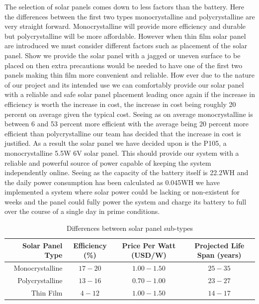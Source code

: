 The selection of solar panels comes down to less factors than the battery. Here the differences between the first two types monocrystalline and polycrystalline are very straight forward. Monocrystalline will provide more efficiency and durable but polycrystalline will be more affordable. However when thin film solar panel are introduced we must consider different factors such as placement of the solar panel. Show we provide the solar panel with a jagged or uneven surface to be placed on then extra precautions would be needed to have one of the first two panels making thin film more convenient and reliable. How ever due to the nature of our project and its intended use we can comfortably provide our solar panel with a reliable and safe solar panel placement leading once again if the increase in efficiency is worth the increase in cost, the increase in cost being roughly 20 percent on average given the typical cost. Seeing as on average monocrystalline is between 6 and 53 percent more efficient with the average being 20 percent more efficient than polycrystalline our team has decided that the increase in cost is justified. As a result the solar panel we have decided upon is the P105, a monocrystalline 5.5W 6V solar panel. This should provide our system with a reliable and powerful source of power capable of keeping the system independently online. Seeing as the capacity of the battery itself is 22.2WH and the daily power consumption has been calculated as 0.045WH we have implemented a system where solar power could be lacking or non-existent for weeks and the panel could fully power the system and charge its battery to full over the course of a single day in prime conditions.

\begin{table}
\centering\footnotesize
\caption{Differences between solar panel sub-types}
\begin{tabular}{|r|c|c|c|}
\hline
Solar Panel Type & Efficiency (\%) & Price Per Watt (USD/W) & Projected Life Span (years) \\ 
\hline\hline
Monocrystalline & $17-20$ & $1.00-1.50$ & $25-35$ \\\hline
Polycrystalline & $13-16$ & $0.70-1.00$ & $23-27$ \\\hline
Thin Film & $4-12$ & $1.00-1.50$ & $14-17$ \\\hline
\end{tabular}
\label{tab:solar-Panel-comparison}
\end{table}

